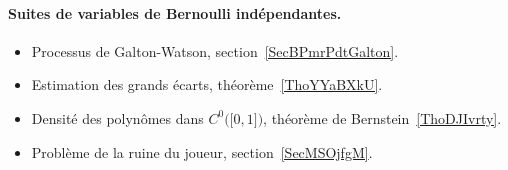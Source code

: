 \paragraph{Suites de variables de Bernoulli indépendantes.}
\begin{itemize}
    \item Processus de Galton-Watson, section~\ref{SecBPmrPdtGalton}.
    \item Estimation des grands écarts, théorème~\ref{ThoYYaBXkU}.
    \item Densité des polynômes dans \( C^0\big( \mathopen[ 0 , 1 \mathclose] \big)\), théorème de Bernstein~\ref{ThoDJIvrty}.
    \item Problème de la ruine du joueur, section~\ref{SecMSOjfgM}.
\end{itemize}
